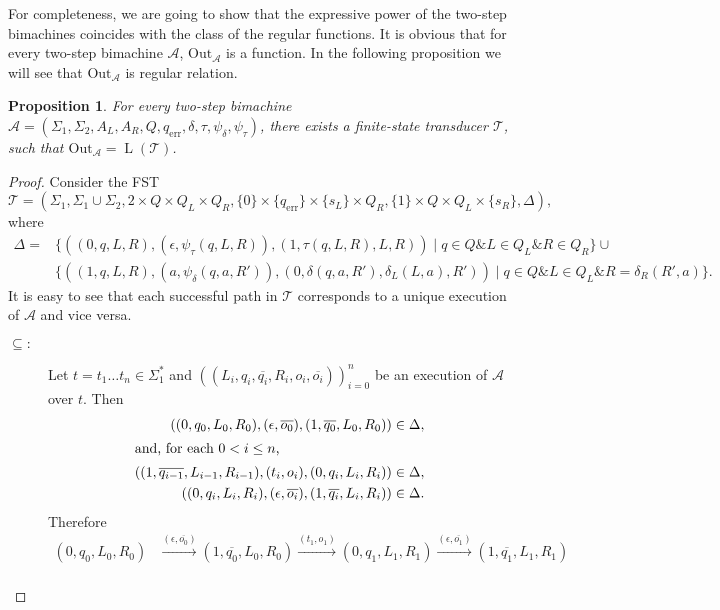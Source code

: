 \documentclass{article}
\newtheorem{proposition}[definition]{Proposition}
\DeclareMathOperator{\Lang}{L}
\begin{document}
	For completeness, we are going to show that the expressive power of the two-step bimachines coincides with the class of the regular functions.
	It is obvious that for every two-step bimachine $\mathcal{A}$, $\mathrm{Out}_\mathcal{A}$ is a function. In the following proposition we will see that $\mathrm{Out}_\mathcal{A}$ is regular relation.
	\begin{proposition}
		For every two-step bimachine $\mathcal{A} = (\Sigma_1, \Sigma_2, A_L, A_R, Q, q_\mathrm{err}, \delta, \tau, \psi_\delta, \psi_\tau)$, there exists a finite-state transducer $\mathcal{T}$, such that $\mathrm{Out}_\mathcal{A} = \Lang(\mathcal{T})$.
	\end{proposition}
	\begin{proof}
		Consider the FST
		\[ \mathcal{T} = (\Sigma_1, \Sigma_1\cup \Sigma_2, 2\times Q\times Q_L\times Q_R, \{0\}\times \{q_\mathrm{err}\}\times \{s_L\}\times Q_R, \{1\}\times Q\times Q_L\times \{s_R\}, \Delta), \]
		where
		\begin{align*}
			\Delta =& \{((0,q,L,R), (\epsilon, \psi_\tau(q, L, R)), (1, \tau(q, L, R), L, R))\mid q\in Q \mathbin\& L\in Q_L \mathbin\& R\in Q_R \} \cup \\
			& \{ ((1,q,L,R), (a,\psi_\delta(q, a, R')), (0,\delta(q, a, R'),\delta_L(L,a),R'))\mid q\in Q \mathbin\& L\in Q_L \mathbin\& R=\delta_R(R', a) \}.
		\end{align*}
		It is easy to see that each successful path in $\mathcal{T}$ corresponds to a unique execution of $\mathcal{A}$ and vice versa.
		\begin{description}
			\item[$\subseteq:$]
				Let $t=t_1\ldots t_n\in \Sigma_1^*$ and $((L_i, q_i, \overline{q_i}, R_i, o_i, \overline{o_i}))_{i=0}^n$ be an execution of $\mathcal{A}$ over $t$.
				Then
				\begin{align*}
					((0, q_0, L_0, R_0), (\epsilon, \overline{o_0}), (1, \overline{q_0}, L_0, R_0))&\in\Delta, \\
					\intertext{and, for each $0 < i\le n$,} %
					((1, \overline{q_{i-1}}, L_{i-1}, R_{i-1}), (t_i, o_i), (0, q_i, L_i, R_i))&\in\Delta, \\
					((0, q_i, L_i, R_i), (\epsilon, \overline{o_i}), (1, \overline{q_i}, L_i, R_i))&\in\Delta.
				\end{align*}
				Therefore
				\begin{align*}
					(0, q_0, L_0, R_0) &\xrightarrow{(\epsilon, \overline{o_0})} (1, \overline{q_0}, L_0, R_0) \xrightarrow{(t_1, o_1)} (0, q_1, L_1, R_1) \xrightarrow{(\epsilon, \overline{o_1})} (1, \overline{q_1}, L_1, R_1) \\

\end{align*}
\end{description}
\end{proof}
\end{document}
